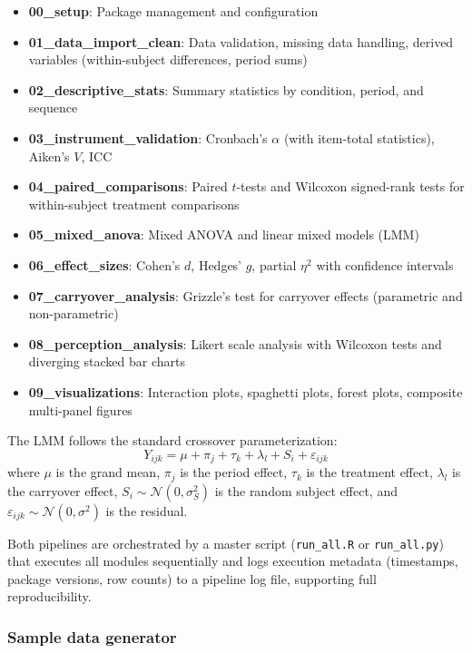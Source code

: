 \documentclass[authoryear,preprint,review,12pt]{elsarticle}
\begin{document}
\begin{itemize}
    \item \textbf{00\_setup}: Package management and configuration
    \item \textbf{01\_data\_import\_clean}: Data validation, missing data
    handling, derived variables (within-subject differences, period sums)
    \item \textbf{02\_descriptive\_stats}: Summary statistics by condition,
    period, and sequence
    \item \textbf{03\_instrument\_validation}: Cronbach's $\alpha$ (with
    item-total statistics), Aiken's $V$, ICC
    \item \textbf{04\_paired\_comparisons}: Paired $t$-tests and Wilcoxon
    signed-rank tests for within-subject treatment comparisons
    \item \textbf{05\_mixed\_anova}: Mixed ANOVA and linear mixed models (LMM)
    \item \textbf{06\_effect\_sizes}: Cohen's $d$, Hedges' $g$, partial
    $\eta^2$ with confidence intervals
    \item \textbf{07\_carryover\_analysis}: Grizzle's test \citep{grizzle1965two}
    for carryover effects (parametric and non-parametric)
    \item \textbf{08\_perception\_analysis}: Likert scale analysis with
    Wilcoxon tests and diverging stacked bar charts
    \item \textbf{09\_visualizations}: Interaction plots, spaghetti plots,
    forest plots, composite multi-panel figures
\end{itemize}

The LMM follows the standard crossover parameterization:
\begin{equation}
    Y_{ijk} = \mu + \pi_j + \tau_k + \lambda_l + S_i + \varepsilon_{ijk}
    \label{eq:model}
\end{equation}
where $\mu$ is the grand mean, $\pi_j$ is the period effect, $\tau_k$ is
the treatment effect, $\lambda_l$ is the carryover effect, $S_i \sim
\mathcal{N}(0, \sigma_S^2)$ is the random subject effect, and
$\varepsilon_{ijk} \sim \mathcal{N}(0, \sigma^2)$ is the residual.

Both pipelines are orchestrated by a master script (\texttt{run\_all.R} or
\texttt{run\_all.py}) that executes all modules sequentially and logs
execution metadata (timestamps, package versions, row counts) to a pipeline
log file, supporting full reproducibility.

\subsubsection{Sample data generator}
\end{document}
